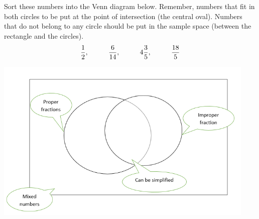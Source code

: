 \documentclass{article}
\begin{document}
\item \quad Sort these numbers into the Venn diagram below. Remember, numbers that fit in both circles to be put at the point of intersection (the central oval). Numbers that do not belong to any circle should be put in the sample space (between the rectangle and the circles). 
\[ \frac{1}{2}, \hspace{1cm} \frac{6}{14}, \hspace{1cm} \Large4\frac{3}{5}, \hspace{1cm}  \frac{18}{5} \]
 \begin{center}
 \includegraphics[width=12.5cm]{Frac_Dec_Per/VennC.png}
\end{center} 
\end{document}
